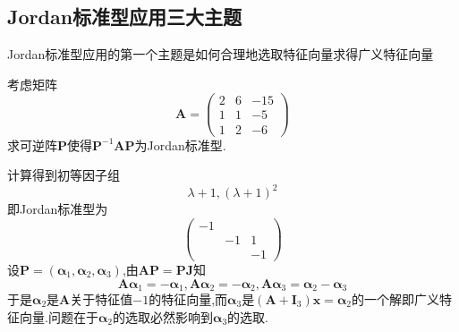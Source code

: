 \subsection{Jordan标准型应用三大主题}
\begin{red}
    \begin{remark}
        \textup{Jordan}标准型应用的第一个主题是如何合理地选取特征向量求得广义特征向量
    \end{remark}
\end{red}
\begin{brown}
    \begin{example}
        考虑矩阵\[
        \bm{A}=\begin{pmatrix}
            2&6&-15\\1&1&-5\\1&2&-6
        \end{pmatrix}\]求可逆阵$\bm{P}$使得$\bm{P}^{-1}\bm{A}\bm{P}$为\textup{Jordan}标准型.
    \end{example}
    \begin{solution}
        计算得到初等因子组\[\lambda+1,
        \left(\lambda+1\right)^2
        \]即\textup{Jordan}标准型为\[
        \begin{pmatrix}
            -1&&\\
            &-1&1\\
            &&-1
        \end{pmatrix}
        \]设$\bm{P}=\left(
            \bm{\alpha}_1,\bm{\alpha}_2,\bm{\alpha}_3
        \right)$,由$\bm{AP}=\bm{PJ}$知\[
        \bm{A\alpha}_1=-\bm{\alpha}_1,\bm{A\alpha}_2=-\bm{\alpha}_2,\bm{A\alpha}_3=\bm{\alpha}_2-\bm{\alpha}_3
        \]于是$\bm{\alpha}_2$是$\bm{A}$关于特征值$-1$的特征向量,而$\bm{\alpha}_3$是$\left(
            \bm{A}+\bm{I}_3
        \right)\bm{x}=\bm{\alpha}_2$的一个解即广义特征向量.问题在于$\bm{\alpha}_2$的选取必然影响到$\bm{\alpha}_3$的选取.


\end{solution}
\end{brown}
